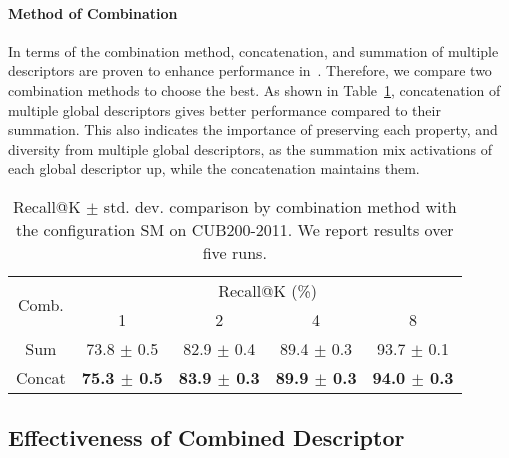\documentclass[10pt,twocolumn,letterpaper]{article}
\begin{document}
\begin{CJK}{UTF8}{mj}
\vspace{-4mm}
\paragraph{Method of Combination}
In terms of the combination method, concatenation, and summation of multiple descriptors are proven to enhance performance in~\cite{Kim_2018_ECCV, shen2017learning, suvisual, tolias2015particular, dai2018batch}.
Therefore, we compare two combination methods to choose the best.
As shown in Table~\ref{table:combination}, concatenation of multiple global descriptors gives better performance compared to their summation.
This also indicates the importance of preserving each property, and diversity from multiple global descriptors, as the summation mix activations of each global descriptor up, while the concatenation maintains them.

\begin{table}[t!]
\begin{center}
\begin{adjustbox}{width=0.96\columnwidth,center}
\begin{tabular}{c|cccc}
\hline
\multirow{2}{*}{Comb.} & \multicolumn{4}{c}{Recall@K (\%)} \\ \cline{2-5} 
                        & 1                     & 2                     & 4                     & 8                     \\
                       \hline\hline
Sum                     & 73.8 $\pm$ 0.5	        & 82.9 $\pm$ 0.4	        & 89.4 $\pm$ 0.3	        & 93.7 $\pm$ 0.1            \\ 
Concat	                & \textbf{75.3 $\pm$ 0.5}	& \textbf{83.9 $\pm$ 0.3}	& \textbf{89.9 $\pm$ 0.3}	& \textbf{94.0 $\pm$ 0.3}   \\ \hline
\end{tabular}
\end{adjustbox}
\end{center}
\caption{Recall@K $\pm$ std. dev. comparison by combination method with the configuration SM on CUB200-2011.
We report results over five runs.}
\label{table:combination}
\vspace{-0.3em}
\end{table}

\subsection{Effectiveness of Combined Descriptor} \label{sec:effectiveness_of_combined_descriptor}

\end{CJK}
\end{document}
